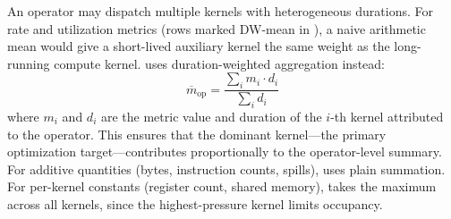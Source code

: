 An operator may dispatch multiple kernels with heterogeneous durations.  For rate and utilization
metrics (rows marked DW-mean in ), a naive arithmetic mean would give a
short-lived auxiliary kernel the same weight as the long-running compute kernel.  \sys uses
duration-weighted aggregation instead:
\begin{equation}
  \overline{m}_\text{op} = \frac{\displaystyle\sum_{i} m_i \cdot d_i}{\displaystyle\sum_{i} d_i}
  \label{eq:dwmean}
\end{equation}
where $m_i$ and $d_i$ are the metric value and duration of the $i$-th kernel attributed to the
operator.  This ensures that the dominant kernel---the primary optimization target---contributes
proportionally to the operator-level summary.  For additive quantities (bytes, instruction counts,
spills), \sys uses plain summation.  For per-kernel constants (register count, shared memory),
\sys takes the maximum across all kernels, since the highest-pressure kernel limits occupancy.
